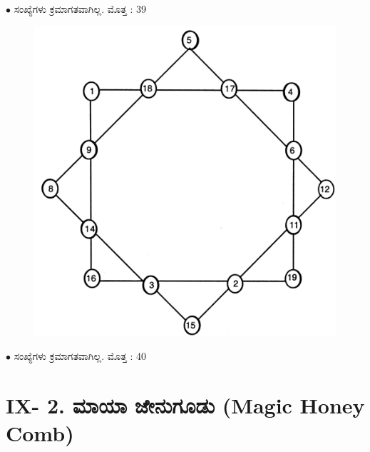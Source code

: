 $\bullet$ ಸಂಖ್ಯೆಗಳು ಕ್ರಮಾಗತವಾಗಿಲ್ಲ. ಮೊತ್ತ : 39
\begin{figure}[H]
\includegraphics[scale=.8]{src/figures/chap8/fig8-7.jpg}
\end{figure}

$\bullet$ ಸಂಖ್ಯೆಗಳು ಕ್ರಮಾಗತವಾಗಿಲ್ಲ. ಮೊತ್ತ : 40
\section*{IX- 2. ಮಾಯಾ ಜೇನುಗೂಡು (Magic Honey Comb)}

